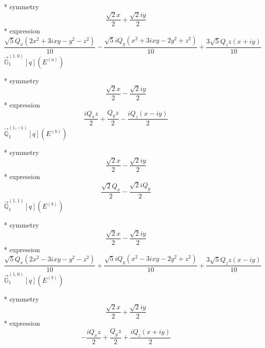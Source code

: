 \documentclass[fleqn,8pt]{jsarticle}
\begin{document}
\noindent\quad ** symmetry
\begin{dmath*}
\frac{\sqrt{2} x}{2} + \frac{\sqrt{2} i y}{2}
\end{dmath*}
\noindent\quad ** expression
\begin{dmath*}
\frac{\sqrt{5} Q_{x} \left(2 x^{2} + 3 i x y - y^{2} - z^{2}\right)}{10} - \frac{\sqrt{5} i Q_{y} \left(x^{2} + 3 i x y - 2 y^{2} + z^{2}\right)}{10} + \frac{3 \sqrt{5} Q_{z} z \left(x + i y\right)}{10}
\end{dmath*}
\noindent\quad $\vec{\mathbb{G}}_{1}^{(1,0)}[q](E^{(a)})$

\noindent\quad ** symmetry
\begin{dmath*}
\frac{\sqrt{2} x}{2} - \frac{\sqrt{2} i y}{2}
\end{dmath*}
\noindent\quad ** expression
\begin{dmath*}
\frac{i Q_{x} z}{2} + \frac{Q_{y} z}{2} - \frac{i Q_{z} \left(x - i y\right)}{2}
\end{dmath*}
\noindent\quad $\vec{\mathbb{Q}}_{1}^{(1,-1)}[q](E^{(b)})$

\noindent\quad ** symmetry
\begin{dmath*}
\frac{\sqrt{2} x}{2} - \frac{\sqrt{2} i y}{2}
\end{dmath*}
\noindent\quad ** expression
\begin{dmath*}
\frac{\sqrt{2} Q_{x}}{2} - \frac{\sqrt{2} i Q_{y}}{2}
\end{dmath*}
\noindent\quad $\vec{\mathbb{Q}}_{1}^{(1,1)}[q](E^{(b)})$

\noindent\quad ** symmetry
\begin{dmath*}
\frac{\sqrt{2} x}{2} - \frac{\sqrt{2} i y}{2}
\end{dmath*}
\noindent\quad ** expression
\begin{dmath*}
\frac{\sqrt{5} Q_{x} \left(2 x^{2} - 3 i x y - y^{2} - z^{2}\right)}{10} + \frac{\sqrt{5} i Q_{y} \left(x^{2} - 3 i x y - 2 y^{2} + z^{2}\right)}{10} + \frac{3 \sqrt{5} Q_{z} z \left(x - i y\right)}{10}
\end{dmath*}
\noindent\quad $\vec{\mathbb{G}}_{1}^{(1,0)}[q](E^{(b)})$

\noindent\quad ** symmetry
\begin{dmath*}
\frac{\sqrt{2} x}{2} + \frac{\sqrt{2} i y}{2}
\end{dmath*}
\noindent\quad ** expression
\begin{dmath*}
- \frac{i Q_{x} z}{2} + \frac{Q_{y} z}{2} + \frac{i Q_{z} \left(x + i y\right)}{2}
\end{dmath*}
\end{document}
